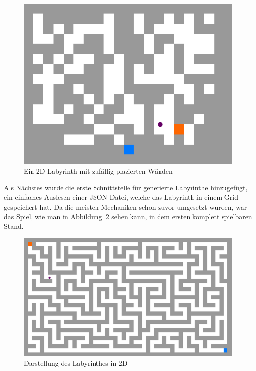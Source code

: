 \begin{figure}[hbtp!]
    \centering
    \includegraphics[width=\paperwidth-6in]{../assets/img/Fr2DTopDownRandom.PNG}
    \caption{Ein 2D Labyrinth mit zufällig plazierten Wänden}
    \label{fig:Fr2DTopDownRandom}
\end{figure}
Als Nächstes wurde die erste Schnittstelle für generierte Labyrinthe hinzugefügt, ein einfaches Auslesen einer JSON Datei, welche das Labyrinth in einem Grid gespeichert hat.
Da die meisten Mechaniken schon zuvor umgesetzt wurden, war das Spiel, wie man in Abbildung~\ref{fig:Fr2DTopDown} sehen kann, in dem ersten komplett spielbaren Stand.

\begin{figure}[hbtp!]
    \centering
    \includegraphics[width=\paperwidth-3in]{../assets/img/Fr2DTopDown.PNG}
    \caption{Darstellung des Labyrinthes in 2D}
    \label{fig:Fr2DTopDown}
\end{figure}

